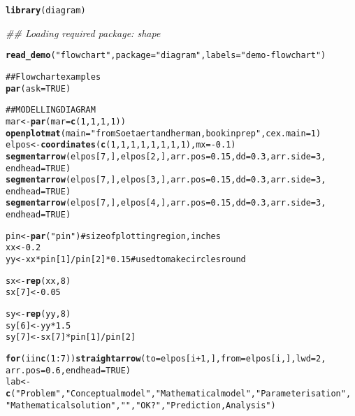 \documentclass{article}\usepackage{graphicx, color}
\makeatletter
\newcommand{\hlfunctioncall}[1]{\textcolor[rgb]{0.501960784313725,0,0.329411764705882}{\textbf{#1}}}%
\newcommand{\hlstring}[1]{\textcolor[rgb]{0.6,0.6,1}{#1}}%
\newcommand{\hlcomment}[1]{\textcolor[rgb]{0.180392156862745,0.6,0.341176470588235}{#1}}%
\newenvironment{kframe}{%
 \def\at@end@of@kframe{}%
 \ifinner\ifhmode%
  \def\at@end@of@kframe{\end{minipage}}%
  \begin{minipage}{\columnwidth}%
 \fi\fi%
 \def\FrameCommand##1{\hskip\@totalleftmargin \hskip-\fboxsep
 \colorbox{shadecolor}{##1}\hskip-\fboxsep
     \hskip-\linewidth \hskip-\@totalleftmargin \hskip\columnwidth}%
 \MakeFramed {\advance\hsize-\width
   \@totalleftmargin\z@ \linewidth\hsize
   \@setminipage}}%
 {\par\unskip\endMakeFramed%
 \at@end@of@kframe}
\newenvironment{knitrout}{}{} %
\makeatother
\begin{document}
\begin{knitrout}
\color{fgcolor}\begin{kframe}
\begin{alltt}
\hlfunctioncall{library}(diagram)
\end{alltt}


{\ttfamily\noindent\itshape\textcolor{messagecolor}{\#\# Loading required package: shape}}\begin{alltt}
\hlfunctioncall{read_demo}(\hlstring{"flowchart"}, package = \hlstring{"diagram"}, labels = \hlstring{"demo-flowchart"})
\end{alltt}
\end{kframe}
\end{knitrout}
\begin{knitrout}
\color{fgcolor}\begin{kframe}
\begin{alltt}
\hlcomment{## Flowchart examples}
\hlfunctioncall{par}(ask = TRUE)

\hlcomment{## MODELLING DIAGRAM}
mar <- \hlfunctioncall{par}(mar = \hlfunctioncall{c}(1, 1, 1, 1))
\hlfunctioncall{openplotmat}(main = \hlstring{"from Soetaert and herman, book in prep"}, cex.main = 1)
elpos <- \hlfunctioncall{coordinates}(\hlfunctioncall{c}(1, 1, 1, 1, 1, 1, 1, 1), mx = -0.1)
\hlfunctioncall{segmentarrow}(elpos[7, ], elpos[2, ], arr.pos = 0.15, dd = 0.3, arr.side = 3, 
    endhead = TRUE)
\hlfunctioncall{segmentarrow}(elpos[7, ], elpos[3, ], arr.pos = 0.15, dd = 0.3, arr.side = 3, 
    endhead = TRUE)
\hlfunctioncall{segmentarrow}(elpos[7, ], elpos[4, ], arr.pos = 0.15, dd = 0.3, arr.side = 3, 
    endhead = TRUE)

pin <- \hlfunctioncall{par}(\hlstring{"pin"})  # size of plotting region, inches
xx <- 0.2
yy <- xx * pin[1]/pin[2] * 0.15  \hlcomment{# used to make circles round}

sx <- \hlfunctioncall{rep}(xx, 8)
sx[7] <- 0.05

sy <- \hlfunctioncall{rep}(yy, 8)
sy[6] <- yy * 1.5
sy[7] <- sx[7] * pin[1]/pin[2]

\hlfunctioncall{for} (i in \hlfunctioncall{c}(1:7)) \hlfunctioncall{straightarrow}(to = elpos[i + 1, ], from = elpos[i, ], lwd = 2, 
    arr.pos = 0.6, endhead = TRUE)
lab <- \hlfunctioncall{c}(\hlstring{"Problem"}, \hlstring{"Conceptual model"}, \hlstring{"Mathematical model"}, \hlstring{"Parameterisation"}, 
    \hlstring{"Mathematical solution"}, \hlstring{""}, \hlstring{"OK?"}, \hlstring{"Prediction, Analysis"})


\end{alltt}
\end{kframe}
\end{knitrout}
\end{document}
